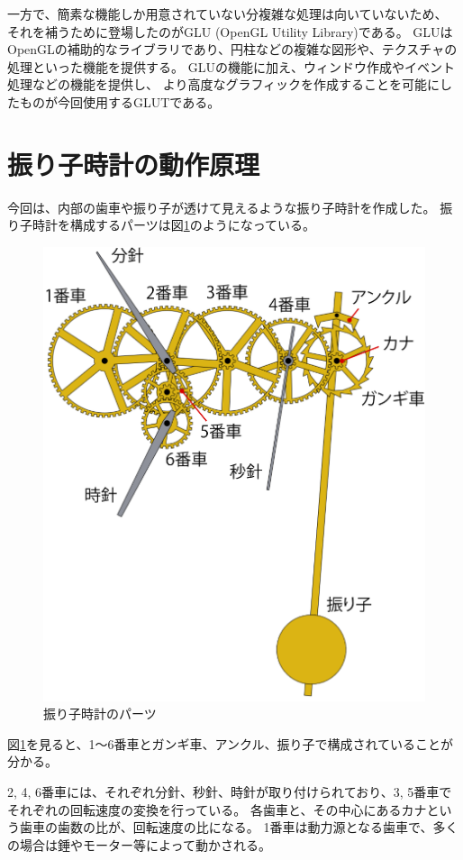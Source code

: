 \documentclass[a4j,titlepage]{jsarticle}
\begin{document}
一方で、簡素な機能しか用意されていない分複雑な処理は向いていないため、
それを補うために登場したのがGLU (OpenGL Utility Library)である。
GLUはOpenGLの補助的なライブラリであり、円柱などの複雑な図形や、テクスチャの処理といった機能を提供する。
GLUの機能に加え、ウィンドウ作成やイベント処理などの機能を提供し、
より高度なグラフィックを作成することを可能にしたものが今回使用するGLUTである。


\section{振り子時計の動作原理 \cite{bib:2}}
今回は、内部の歯車や振り子が透けて見えるような振り子時計を作成した。
振り子時計を構成するパーツは図\ref{fig:parts}のようになっている。

\begin{figure}[H]
  \centering
  \includegraphics[width=12cm]{動作原理.pdf}
  \caption{振り子時計のパーツ}
  \label{fig:parts}
\end{figure}

図\ref{fig:parts}を見ると、1～6番車とガンギ車、アンクル、振り子で構成されていることが分かる。

2, 4, 6番車には、それぞれ分針、秒針、時針が取り付けられており、3, 5番車でそれぞれの回転速度の変換を行っている。
各歯車と、その中心にあるカナという歯車の歯数の比が、回転速度の比になる。
1番車は動力源となる歯車で、多くの場合は錘やモーター等によって動かされる。
\end{document}
